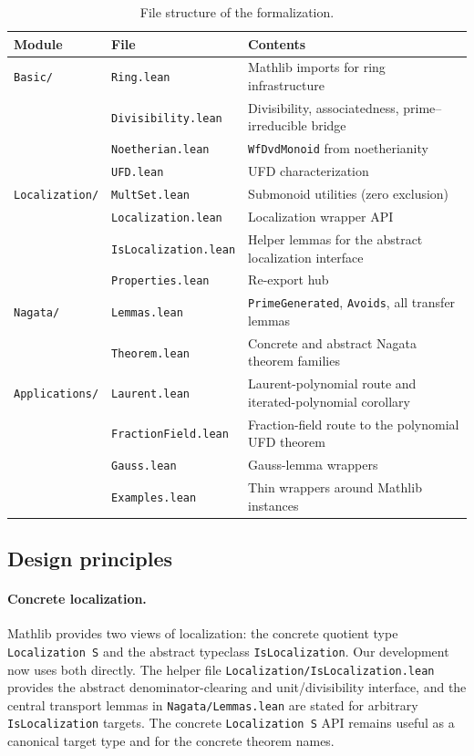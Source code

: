 \documentclass[11pt]{article}
\theoremstyle{plain}
\theoremstyle{definition}
\theoremstyle{remark}
\newcommand{\li}[1]{\texorpdfstring{\texttt{#1}}{#1}}
\newcommand{\lf}[1]{\texorpdfstring{\nolinkurl{#1}}{#1}}
\begin{document}
\begin{table}[ht]
\centering
\caption{File structure of the formalization.}\label{tab:files}
\smallskip
\begin{tabular}{@{}ll>{\raggedright\arraybackslash}p{7.2cm}@{}}
\toprule
\textbf{Module} & \textbf{File} & \textbf{Contents} \\
\midrule
\texttt{Basic/}
  & \texttt{Ring.lean}
  & Mathlib imports for ring infrastructure \\
  & \texttt{Divisibility.lean}
  & Divisibility, associatedness, prime--irreducible bridge \\
  & \texttt{Noetherian.lean}
  & \li{WfDvdMonoid} from noetherianity \\
  & \texttt{UFD.lean}
  & UFD characterization \\
\midrule
\texttt{Localization/}
  & \texttt{MultSet.lean}
  & Submonoid utilities (zero exclusion) \\
  & \texttt{Localization.lean}
  & Localization wrapper API \\
  & \texttt{IsLocalization.lean}
  & Helper lemmas for the abstract localization interface \\
  & \texttt{Properties.lean}
  & Re-export hub \\
\midrule
\texttt{Nagata/}
  & \texttt{Lemmas.lean}
  & \li{PrimeGenerated}, \li{Avoids}, all transfer lemmas \\
  & \texttt{Theorem.lean}
  & Concrete and abstract Nagata theorem families \\
\midrule
\texttt{Applications/}
  & \texttt{Laurent.lean}
  & Laurent-polynomial route and iterated-polynomial corollary \\
  & \texttt{FractionField.lean}
  & Fraction-field route to the polynomial UFD theorem \\
  & \texttt{Gauss.lean}
  & Gauss-lemma wrappers \\
  & \texttt{Examples.lean}
  & Thin wrappers around Mathlib instances \\
\bottomrule
\end{tabular}
\end{table}

\subsection{Design principles}

\paragraph{Concrete localization.}
Mathlib provides two views of localization: the concrete quotient type
\li{Localization\,S} and the abstract typeclass \li{IsLocalization}.  Our
development now uses both directly.  The helper file
\lf{Localization/IsLocalization.lean} provides the abstract denominator-clearing
and unit/divisibility interface, and the central transport lemmas in
\lf{Nagata/Lemmas.lean} are stated for arbitrary \li{IsLocalization} targets.
The concrete \li{Localization\,S} API remains useful as a canonical target type
and for the concrete theorem names.
\end{document}

